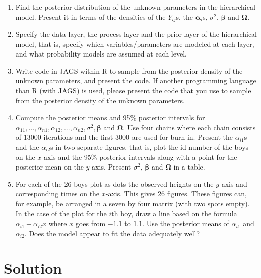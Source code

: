 \documentclass[
]{homework}
\begin{document}
\begin{enumerate}[label = (\alph*)]
  \item Find the posterior distribution of the unknown parameters in the hierarchical model. Present it in terms of the densities of the $Y_{ij}$s, the $\boldsymbol\alpha_i$s,
  $\sigma^2$, $\boldsymbol\beta$ and $\boldsymbol\Omega$.
  
  \item Specify the data layer, the process layer and the prior layer of the hierarchical model, that is, specify which variables/parameters are modeled at each layer, and what         
  probability models are assumed at each level.
  
  \item Write code in \textsf{JAGS} within \textsf{R} to sample from the posterior density of the unknown parameters, and present the code. If another programming language than \textsf{R} (with \textsf{JAGS}) is used,
  please present the code that you use to sample from the posterior density of the unknown parameters.
  
  \item Compute the posterior means and 95\% posterior intervals for $\alpha_{11}, \ldots, \alpha_{n1}, \alpha_{12}, \ldots, \alpha_{n2}, \sigma^2, \boldsymbol\beta$ and $\boldsymbol\Omega$. Use four chains where each chain consists of 13000 iterations and the first 3000 are used for burn-in. Present the $\alpha_{i1}$s and the $\alpha_{i2}$s
  in two separate figures, that is, plot the id-number of the boys on the $x$-axis and the 95\% posterior intervals along with a point for the posterior mean on the $y$-axis.
  Present $\sigma^2$, $\boldsymbol\beta$ and $\boldsymbol\Omega$ in a table.
  
  \item For each of the 26 boys plot as dots the observed heights on the $y$-axis and corresponding times on the $x$-axis. This gives 26 figures. These figures can, for example, be arranged in a seven by four matrix (with two spots empty). In the case of the plot for the $i$th boy, draw a line based on the formula $\alpha_{i1} + \alpha_{i2}x$ where $x$
  goes from $-1.1$ to $1.1$. Use the posterior means of $\alpha_{i1}$ and $\alpha_{i2}$. Does the model appear to fit the data adequately well?
\end{enumerate}

\section{Solution}\label{solution-4}
\end{document}
